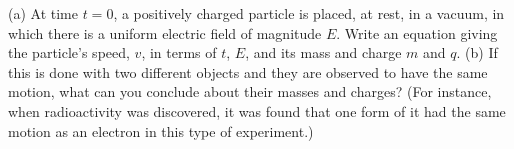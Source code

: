         (a) At time $t=0$, a positively charged particle is
        placed, at rest, in a vacuum, in which there is
        a uniform electric field of magnitude
        $E$.  Write an equation giving the particle's speed, $v$, in terms of
        $t$, $E$, and its mass and charge $m$ and $q$.\answercheck\hwendpart
        (b) If this is done with two different objects and they are
        observed to have the same motion, what can you conclude
        about their masses and charges?  (For instance, when
        radioactivity was discovered, it was found that one form of
        it had the same motion as an electron in this type of experiment.)
